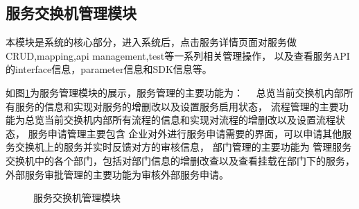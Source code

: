 \subsection{服务交换机管理模块}
本模块是系统的核心部分，进入系统后，点击服务详情页面对服务做CRUD,mapping,api management,test等一系列相关管理操作，
以及查看服务API的interface信息，parameter信息和SDK信息等。

如图\ref{fig:fuwuguanli}为服务管理模块的展示，服务管理的主要功能为：　
总览当前交换机内部所有服务的信息和实现对服务的增删改以及设置服务启用状态，
流程管理的主要功能为总览当前交换机内部所有流程的信息和实现对流程的增删改以及设置流程状态，
服务申请管理主要包含
企业对外进行服务申请需要的界面，可以申请其他服务交换机上的服务并实时反馈对方的审核信息，
部门管理的主要功能为
管理服务交换机中的各个部门，包括对部门信息的增删改查以及查看挂载在部门下的服务，
外部服务审批管理的主要功能为审核外部服务申请。
\begin{figure}[htbp]
  \caption{服务交换机管理模块}
  \label{fig:fuwuguanli}
  \end{figure}

